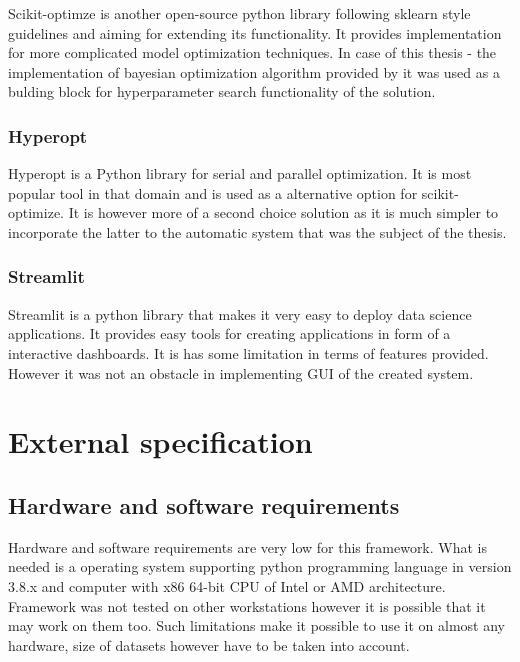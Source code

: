 \documentclass[a4paper,twoside,12pt]{book}
\begin{document}
Scikit-optimze is another open-source python library following sklearn style guidelines and aiming for extending its functionality. It provides implementation for more complicated model optimization techniques.
In case of this thesis - the implementation of bayesian optimization algorithm provided by it was used as a bulding block for hyperparameter search functionality of the solution. 

\subsection{Hyperopt}

Hyperopt is a Python library for serial and parallel optimization. It is most popular tool in that domain and is used as a alternative option for scikit-optimize. It is however more of a second choice solution as it is much simpler to incorporate the latter to the automatic system that was the subject of the thesis.

\subsection{Streamlit}

Streamlit is a python library that makes it very easy to deploy data science applications. It provides easy tools for creating applications in form of a interactive dashboards. It is has some limitation in terms of features provided. However it was not an obstacle in implementing GUI of the created system. 



\chapter{External specification}

\section{Hardware and software requirements}


Hardware and software requirements are very low for this framework. What is needed is a operating system supporting python programming language in version 3.8.x and computer with x86 64-bit CPU of Intel or AMD architecture. Framework was not tested on other workstations however it is possible that it may work on them too.
Such limitations make it possible to use it on almost any hardware, size of datasets however have to be taken into account.
\end{document}
